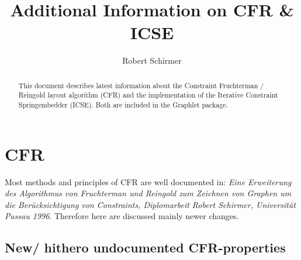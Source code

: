 \documentclass[notitlepage,fleqn]{article}
\begin{document}
%
%


\title{Additional Information on CFR \& ICSE}
\author{Robert Schirmer}
\maketitle

\begin{abstract}
  This document describes latest information about
  the Constraint Fruch\-terman / Reingold 
  layout algorithm (CFR) and 
  the implementation of 
  the Iterative Constraint Springembedder (ICSE).
  Both are included in the Graphlet package.
\end{abstract}


\section{CFR}

Most methods and principles of CFR are well documented in:
{\em Eine Erweiterung des Algorithmus von Fruchterman und
Reingold zum Zeichnen von Graphen um die Ber\"u{}cksichtigung
von Constraints, Diplomarbeit Robert Schirmer, Universit\"a{}t Passau
1996}. Therefore here are discussed mainly newer changes. 

\subsection{New/ hithero undocumented CFR-properties}
\end{document}
